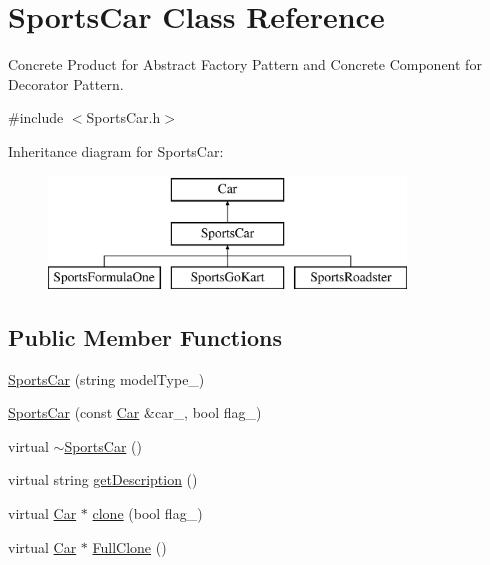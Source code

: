 \hypertarget{class_sports_car}{}\section{Sports\+Car Class Reference}
\label{class_sports_car}


Concrete Product for Abstract Factory Pattern and Concrete Component for Decorator Pattern.  




{\ttfamily \#include $<$Sports\+Car.\+h$>$}

Inheritance diagram for Sports\+Car\+:\begin{figure}[H]
\begin{center}
\leavevmode
\includegraphics[height=3.000000cm]{class_sports_car}
\end{center}
\end{figure}
\subsection*{Public Member Functions}
\begin{DoxyCompactItemize}
\item 
\mbox{\hyperlink{class_sports_car_a12c07f42ba9979fda7e3de7fc195ed0a}{Sports\+Car}} (string model\+Type\+\_\+)
\item 
\mbox{\hyperlink{class_sports_car_a92c5c238debbe61e1db2b2e42a81e814}{Sports\+Car}} (const \mbox{\hyperlink{class_car}{Car}} \&car\+\_\+, bool flag\+\_\+)
\item 
virtual \mbox{\hyperlink{class_sports_car_a556357475654f0c32c3b28cb436cb379}{$\sim$\+Sports\+Car}} ()
\item 
virtual string \mbox{\hyperlink{class_sports_car_af530b222b2229bf8f4f95dd2c79bac3a}{get\+Description}} ()
\item 
virtual \mbox{\hyperlink{class_car}{Car}} $\ast$ \mbox{\hyperlink{class_sports_car_a4daa739baaee9d9d5ad33f4766ec43ec}{clone}} (bool flag\+\_\+)
\item 
virtual \mbox{\hyperlink{class_car}{Car}} $\ast$ \mbox{\hyperlink{class_sports_car_a55002e6cf1f09b4a5d0e4c59c938e3a5}{Full\+Clone}} ()
\end{DoxyCompactItemize}

